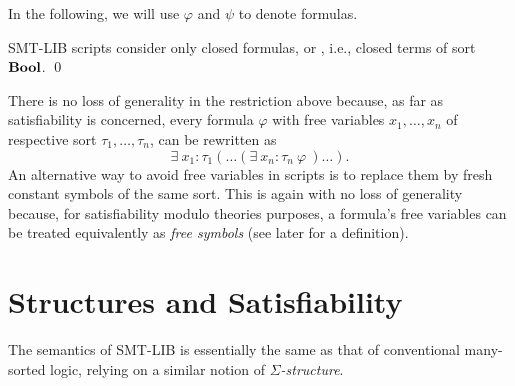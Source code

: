 In the following, we will use $\varphi$ and $\psi$ to denote formulas.
\medskip

\begin{constraint}
SMT-LIB scripts consider only closed formulas,
or , i.e., closed terms of sort $\textbf{Bool}$.
\qed
\end{constraint}

There is no loss of generality in the restriction above because,
as far as satisfiability is concerned,
every formula $\varphi$ with free variables 
$x_1, \ldots, x_n$ of respective sort $\tau_1, \ldots, \tau_n$,
can be rewritten as 
\[
 \exists\: x_1{:}\tau_1 ( \ldots (\exists\:x_n{:}\tau_n\: \varphi\ )\ldots).
\]
An alternative way to avoid free variables in scripts is 
to replace them by fresh constant symbols of the same sort.
This is again with no loss of generality because,
for satisfiability modulo theories purposes,
a formula's free variables can be treated equivalently as 
\emph{free symbols} (see later for a definition).


\section{Structures and Satisfiability} \label{sec:models}

The semantics of SMT-LIB is essentially the same as that 
of conventional many-sorted logic,
relying on a similar notion of \emph{$\Sigma$-structure}.


